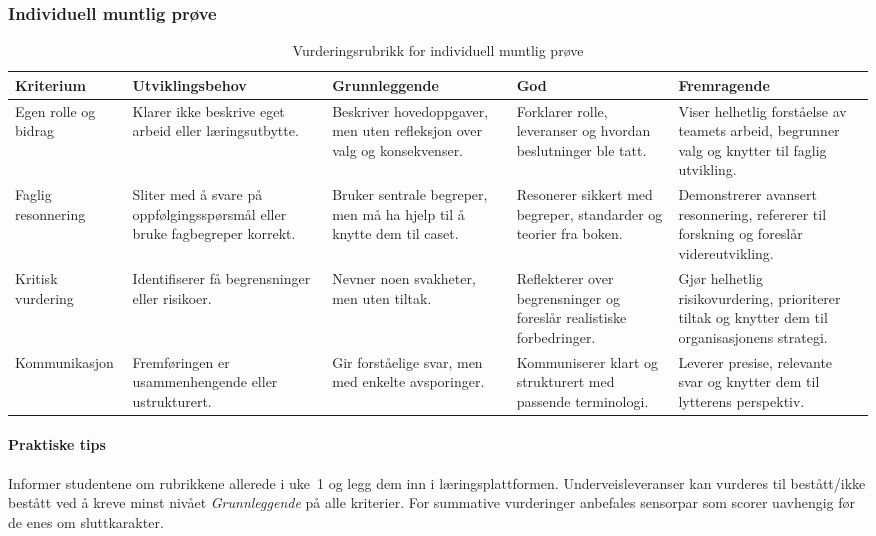 \subsubsection{Individuell muntlig prøve}
\begin{table}[h]
    \centering
    \caption{Vurderingsrubrikk for individuell muntlig prøve}
    \label{tab:rubrikk-muntlig}
    \begin{tabular}{p{2.8cm}p{3.0cm}p{3.0cm}p{3.0cm}p{3.0cm}}
        \toprule
        \textbf{Kriterium} & \textbf{Utviklingsbehov} & \textbf{Grunnleggende} & \textbf{God} & \textbf{Fremragende} \\
        \midrule
        Egen rolle og bidrag & Klarer ikke beskrive eget arbeid eller læringsutbytte. & Beskriver hovedoppgaver, men uten refleksjon over valg og konsekvenser. & Forklarer rolle, leveranser og hvordan beslutninger ble tatt. & Viser helhetlig forståelse av teamets arbeid, begrunner valg og knytter til faglig utvikling. \\
        Faglig resonnering & Sliter med å svare på oppfølgingsspørsmål eller bruke fagbegreper korrekt. & Bruker sentrale begreper, men må ha hjelp til å knytte dem til caset. & Resonerer sikkert med begreper, standarder og teorier fra boken. & Demonstrerer avansert resonnering, refererer til forskning og foreslår videreutvikling. \\
        Kritisk vurdering & Identifiserer få begrensninger eller risikoer. & Nevner noen svakheter, men uten tiltak. & Reflekterer over begrensninger og foreslår realistiske forbedringer. & Gjør helhetlig risikovurdering, prioriterer tiltak og knytter dem til organisasjonens strategi. \\
        Kommunikasjon & Fremføringen er usammenhengende eller ustrukturert. & Gir forståelige svar, men med enkelte avsporinger. & Kommuniserer klart og strukturert med passende terminologi. & Leverer presise, relevante svar og knytter dem til lytterens perspektiv. \\
        \bottomrule
    \end{tabular}
\end{table}

\paragraph{Praktiske tips}
Informer studentene om rubrikkene allerede i uke~1 og legg dem inn i læringsplattformen. Underveisleveranser kan vurderes til bestått/ikke bestått ved å kreve minst nivået \emph{Grunnleggende} på alle kriterier. For summative vurderinger anbefales sensorpar som scorer uavhengig før de enes om sluttkarakter.

